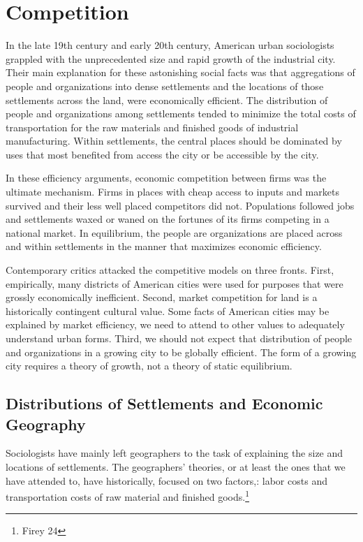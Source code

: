 \section*{Competition} 
In the late 19th century and early 20th century, American urban
sociologists grappled with the unprecedented size and rapid growth of
the industrial city. Their main explanation for these astonishing
social facts was that aggregations of people and organizations into
dense settlements and the locations of those settlements across the
land, were economically efficient. The distribution of people and
organizations among settlements tended to minimize the total costs of
transportation for the raw materials and finished goods of industrial
manufacturing. Within settlements, the central places should be
dominated by uses that most benefited from access the city or be
accessible by the city.

In these efficiency arguments, economic competition between firms was
the ultimate mechanism. Firms in places with cheap access to inputs
and markets survived and their less well placed competitors did
not. Populations followed jobs and settlements waxed or waned on the
fortunes of its firms competing in a national market.  In equilibrium,
the people are organizations are placed across and within settlements
in the manner that maximizes economic efficiency.

Contemporary critics attacked the competitive models on three
fronts. First, empirically, many districts of American cities were
used for purposes that were grossly economically inefficient. Second,
market competition for land is a historically contingent cultural
value. Some facts of American cities may be explained by market
efficiency, we need to attend to other values to adequately understand
urban forms. Third, we should not expect that distribution of people
and organizations in a growing city to be globally efficient. The form
of a growing city requires a theory of growth, not a theory of static
equilibrium. 

\subsection*{Distributions of Settlements and Economic Geography}
Sociologists have mainly left geographers to the task of explaining
the size and locations of settlements. The geographers' theories, or
at least the ones that we have attended to, have historically, focused
on two factors,: labor costs and transportation costs of raw material and
finished goods.\footnote{Firey 24}

